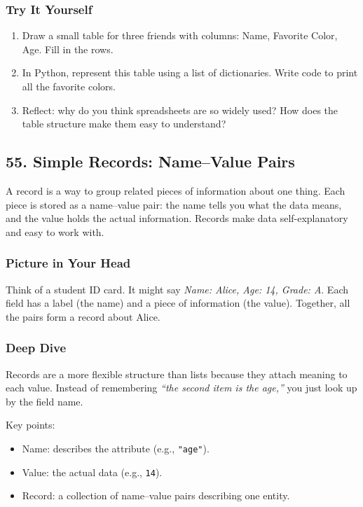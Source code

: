 \documentclass[
  letterpaper,
  DIV=11,
  numbers=noendperiod]{scrreprt}
\providecommand{\tightlist}{%
  \setlength{\itemsep}{0pt}\setlength{\parskip}{0pt}}
\begin{document}
\subsubsection{Try It Yourself}\label{try-it-yourself-53}

\begin{enumerate}
\def\labelenumi{\arabic{enumi}.}
\tightlist
\item
  Draw a small table for three friends with columns: Name, Favorite
  Color, Age. Fill in the rows.
\item
  In Python, represent this table using a list of dictionaries. Write
  code to print all the favorite colors.
\item
  Reflect: why do you think spreadsheets are so widely used? How does
  the table structure make them easy to understand?
\end{enumerate}

\subsection{55. Simple Records: Name--Value
Pairs}\label{simple-records-namevalue-pairs}

A record is a way to group related pieces of information about one
thing. Each piece is stored as a name--value pair: the name tells you
what the data means, and the value holds the actual information. Records
make data self-explanatory and easy to work with.

\subsubsection{Picture in Your Head}\label{picture-in-your-head-54}

Think of a student ID card. It might say \emph{Name: Alice, Age: 14,
Grade: A}. Each field has a label (the name) and a piece of information
(the value). Together, all the pairs form a record about Alice.

\subsubsection{Deep Dive}\label{deep-dive-24}

Records are a more flexible structure than lists because they attach
meaning to each value. Instead of remembering \emph{``the second item is
the age,''} you just look up by the field name.

Key points:

\begin{itemize}
\tightlist
\item
  Name: describes the attribute (e.g., \texttt{"age"}).
\item
  Value: the actual data (e.g., \texttt{14}).
\item
  Record: a collection of name--value pairs describing one entity.
\end{itemize}
\end{document}
